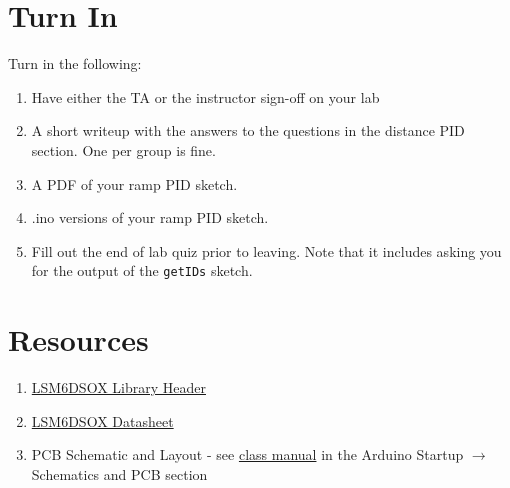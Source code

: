 \section{Turn In}
Turn in the following:
\begin{enumerate}
    \item Have either the TA or the instructor sign-off on your lab
    \item A short writeup with the answers to the questions in the distance PID section. One per group is fine.
    \item A PDF of your ramp PID sketch.
    \item .ino versions of your ramp PID sketch.
    \item Fill out the end of lab quiz prior to leaving. Note that it includes asking you 
            for the output of the \lstinline$getIDs$ sketch. 
\end{enumerate}

\section{Resources}\label{sec:controlsresources}
\begin{enumerate}
    \item \href{https://github.com/stm32duino/LSM6DSOX/blob/main/src/LSM6DSOXSensor.h}{LSM6DSOX Library Header}
    \item \href{https://www.st.com/resource/en/datasheet/lsm6dsox.pdf}{LSM6DSOX Datasheet}
    \item PCB Schematic and Layout - see 
            \href{https://github.com/semcneil/Fundamentals-of-Microcontrollers-Manual}{class manual} 
            in the Arduino Startup $\rightarrow$ Schematics and PCB section
\end{enumerate}

